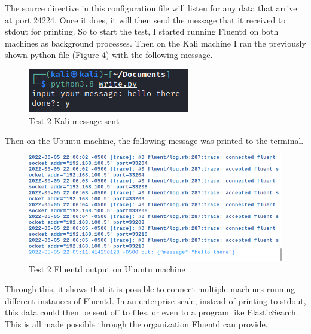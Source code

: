 The source directive in this configuration file will listen for any data that arrive at port 24224. Once it does, it will then send the message that it received to stdout for printing. So to start the test, I started running Fluentd on both machines as background processes.
Then on the Kali machine I ran the previously shown python file (Figure 4) with the following message.
\begin{figure}[H]
    \centering
    \includegraphics[scale=1]{images/t2_3.png}
    \caption{Test 2 Kali message sent}
    \label{fig:pic9}
\end{figure}
Then on the Ubuntu machine, the following message was printed to the terminal.
\begin{figure}[H]
    \centering
    \includegraphics[scale=0.75]{images/t2_4.png}
    \caption{Test 2 Fluentd output on Ubuntu machine}
    \label{fig:pic10}
\end{figure}
Through this, it shows that it is possible to connect multiple machines running different instances of Fluentd. In an enterprise scale, instead of printing to stdout, this data could then be sent off to files, or even to a program like 
ElasticSearch. This is all made possible through the organization Fluentd can provide.
